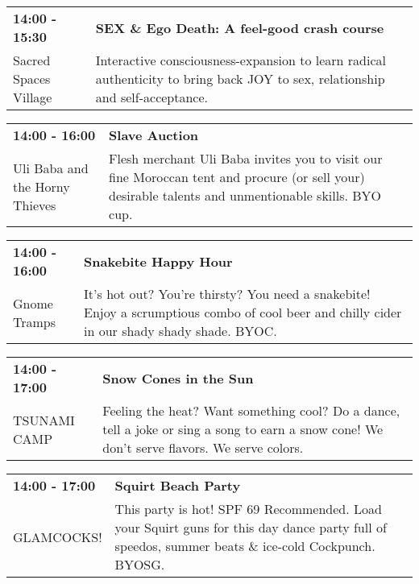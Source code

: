 \begin{tabular}{ p{1in} p{2.2in} }
    \textbf{14:00 - 15:30} & \textbf{SEX \& Ego Death: A feel-good crash course } \\
    Sacred Spaces Village \newline  & Interactive consciousness-expansion to learn radical authenticity to bring back JOY to sex, relationship and self-acceptance. \\
    \hline 
\end{tabular}
    
\begin{tabular}{ p{1in} p{2.2in} }
    \textbf{14:00 - 16:00} & \textbf{Slave Auction} \\
    Uli Baba and the Horny Thieves \newline  & Flesh merchant Uli Baba invites you to visit our fine Moroccan tent
and procure (or sell your) desirable talents and unmentionable skills.
BYO cup. \\
    \hline 
\end{tabular}
    
\begin{tabular}{ p{1in} p{2.2in} }
    \textbf{14:00 - 16:00} & \textbf{Snakebite Happy Hour} \\
    Gnome Tramps \newline  & It's hot out? You're thirsty? You need a snakebite! Enjoy a scrumptious combo of cool beer and chilly cider in our shady shady shade. BYOC. \\
    \hline 
\end{tabular}
    
\begin{tabular}{ p{1in} p{2.2in} }
    \textbf{14:00 - 17:00} & \textbf{Snow Cones in the Sun} \\
    TSUNAMI CAMP \newline  & Feeling the heat?  Want something cool?
Do a dance, tell a joke or sing a song to earn a snow cone!  We don't serve flavors. We serve colors. \\
    \hline 
\end{tabular}
    
\begin{tabular}{ p{1in} p{2.2in} }
    \textbf{14:00 - 17:00} & \textbf{Squirt Beach Party } \\
    GLAMCOCKS! \newline  & This party is hot! SPF 69 Recommended. Load your Squirt guns for this day dance party full of speedos, summer beats \& ice-cold Cockpunch. BYOSG. \\
    \hline 
\end{tabular}
    
